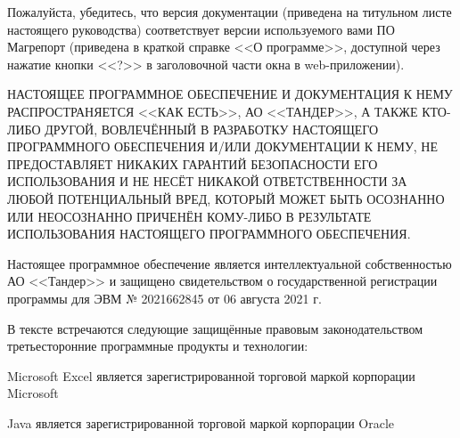 \documentclass[../user-manual.tex]{subfiles}
\begin{document}
	
	\thispagestyle{empty}
	
	\small
	
	\noindent Пожалуйста, убедитесь, что версия документации (приведена на титульном листе настоящего руководства) соответствует версии используемого вами ПО Магрепорт (приведена в краткой справке <<О программе>>, доступной через нажатие кнопки <<?>> в заголовочной части окна в web-приложении).
	
	\bigskip
	
	\noindent НАСТОЯЩЕЕ ПРОГРАММНОЕ ОБЕСПЕЧЕНИЕ И ДОКУМЕНТАЦИЯ К НЕМУ РАСПРОСТРАНЯЕТСЯ <<КАК ЕСТЬ>>, АО <<ТАНДЕР>>, А ТАКЖЕ КТО-ЛИБО ДРУГОЙ, ВОВЛЕЧЁННЫЙ В РАЗРАБОТКУ НАСТОЯЩЕГО ПРОГРАММНОГО ОБЕСПЕЧЕНИЯ И/ИЛИ ДОКУМЕНТАЦИИ К НЕМУ, НЕ ПРЕДОСТАВЛЯЕТ НИКАКИХ ГАРАНТИЙ БЕЗОПАСНОСТИ ЕГО ИСПОЛЬЗОВАНИЯ И НЕ НЕСЁТ НИКАКОЙ ОТВЕТСТВЕННОСТИ ЗА ЛЮБОЙ ПОТЕНЦИАЛЬНЫЙ ВРЕД, КОТОРЫЙ МОЖЕТ БЫТЬ ОСОЗНАННО ИЛИ НЕОСОЗНАННО ПРИЧЕНЁН КОМУ-ЛИБО В РЕЗУЛЬТАТЕ ИСПОЛЬЗОВАНИЯ НАСТОЯЩЕГО ПРОГРАММНОГО ОБЕСПЕЧЕНИЯ.
	
	\bigskip	
	
	\noindent Настоящее программное обеспечение является интеллектуальной собственностью АО <<Тандер>> и защищено свидетельством о государственной регистрации программы для ЭВМ № 2021662845 от 06 августа 2021 г.
	
	\bigskip
	
	\noindent В тексте встречаются следующие защищённые правовым законодательством третьесторонние программные продукты и технологии:
	
	\medskip
	
	\noindent Microsoft Excel является зарегистрированной торговой маркой корпорации Microsoft
	
	\noindent Java является зарегистрированной торговой маркой корпорации Oracle
	
\end{document}
